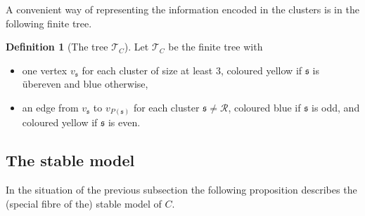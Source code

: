 \documentclass[12pt]{amsart}
\numberwithin{equation}{section}
\theoremstyle{remark}
\theoremstyle{definition}
\theoremstyle{definition}
\theoremstyle{definition}
\newtheorem{defi}[equation]{Definition}
\theoremstyle{definition}
\theoremstyle{definition}
\theoremstyle{definition}
\begin{document}
A convenient way of representing the information encoded in the clusters is in the following finite tree.

\begin{defi}[The tree $\mathcal{T}_C$]
Let $\mathcal{T}_C$ be the finite tree with
\begin{itemize}
\item one vertex $v_{\mathfrak{s}}$ for each cluster of size at least $3$, coloured yellow if $\mathfrak{s}$ is \"{u}bereven and blue otherwise,
\item an edge from $v_{\mathfrak{s}}$ to $v_{P(\mathfrak{s})}$ for each cluster $\mathfrak{s}\neq \mathcal{R}$, coloured blue if $\mathfrak{s}$ is odd, and coloured yellow if $\mathfrak{s}$ is even.
\end{itemize}
\end{defi}

\subsection{The stable model}

In the situation of the previous subsection the following proposition describes the (special fibre of the) stable model of $C$. 
\end{document}
